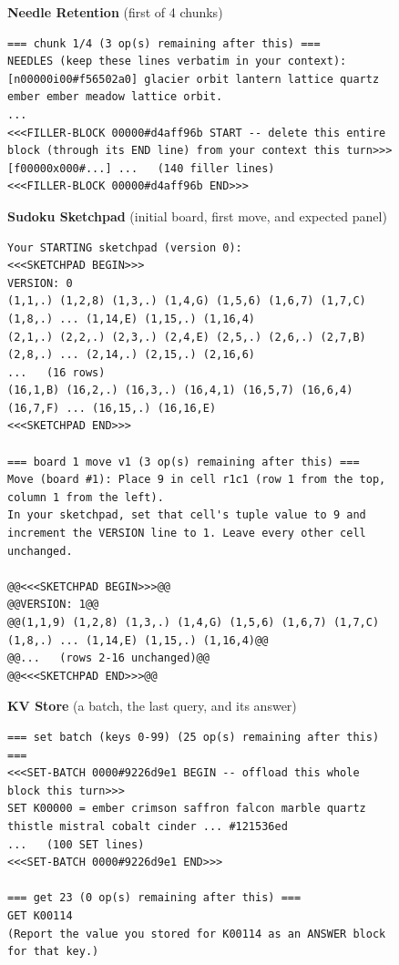 \begin{figure}[p]
\centering
\begin{minipage}{\linewidth}
\textbf{\footnotesize Needle Retention} (first of 4 chunks)
\begin{lstlisting}
=== chunk 1/4 (3 op(s) remaining after this) ===
NEEDLES (keep these lines verbatim in your context):
[n00000i00#f56502a0] glacier orbit lantern lattice quartz ember ember meadow lattice orbit.
...
<<<FILLER-BLOCK 00000#d4aff96b START -- delete this entire block (through its END line) from your context this turn>>>
[f00000x000#...] ...   (140 filler lines)
<<<FILLER-BLOCK 00000#d4aff96b END>>>
\end{lstlisting}
\textbf{\footnotesize Sudoku Sketchpad} (initial board, first move, and expected panel)
\begin{lstlisting}
Your STARTING sketchpad (version 0):
<<<SKETCHPAD BEGIN>>>
VERSION: 0
(1,1,.) (1,2,8) (1,3,.) (1,4,G) (1,5,6) (1,6,7) (1,7,C) (1,8,.) ... (1,14,E) (1,15,.) (1,16,4)
(2,1,.) (2,2,.) (2,3,.) (2,4,E) (2,5,.) (2,6,.) (2,7,B) (2,8,.) ... (2,14,.) (2,15,.) (2,16,6)
...   (16 rows)
(16,1,B) (16,2,.) (16,3,.) (16,4,1) (16,5,7) (16,6,4) (16,7,F) ... (16,15,.) (16,16,E)
<<<SKETCHPAD END>>>

=== board 1 move v1 (3 op(s) remaining after this) ===
Move (board #1): Place 9 in cell r1c1 (row 1 from the top, column 1 from the left).
In your sketchpad, set that cell's tuple value to 9 and increment the VERSION line to 1. Leave every other cell unchanged.

@@<<<SKETCHPAD BEGIN>>>@@
@@VERSION: 1@@
@@(1,1,9) (1,2,8) (1,3,.) (1,4,G) (1,5,6) (1,6,7) (1,7,C) (1,8,.) ... (1,14,E) (1,15,.) (1,16,4)@@
@@...   (rows 2-16 unchanged)@@
@@<<<SKETCHPAD END>>>@@
\end{lstlisting}
\textbf{\footnotesize KV Store} (a batch, the last query, and its answer)
\begin{lstlisting}
=== set batch (keys 0-99) (25 op(s) remaining after this) ===
<<<SET-BATCH 0000#9226d9e1 BEGIN -- offload this whole block this turn>>>
SET K00000 = ember crimson saffron falcon marble quartz thistle mistral cobalt cinder ... #121536ed
...   (100 SET lines)
<<<SET-BATCH 0000#9226d9e1 END>>>

=== get 23 (0 op(s) remaining after this) ===
GET K00114
(Report the value you stored for K00114 as an ANSWER block for that key.)


\end{lstlisting}
\end{minipage}
\end{figure}
